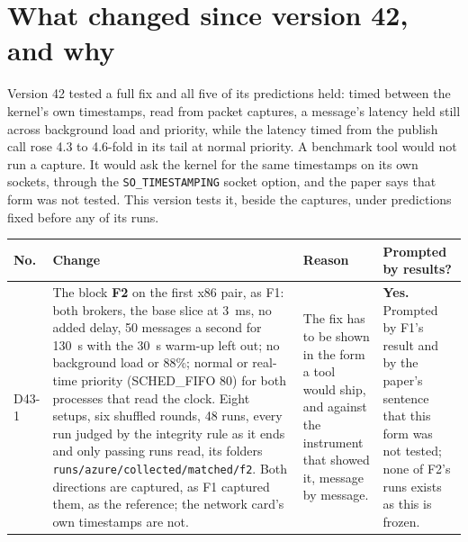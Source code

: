 \documentclass[11pt]{article}
\begin{document}
\section*{What changed since version 42, and why}
Version 42 tested a full fix and all five of its predictions held: timed between the kernel's own
timestamps, read from packet captures, a message's latency held still across background load and
priority, while the latency timed from the publish call rose 4.3 to 4.6-fold in its tail at normal
priority. A benchmark tool would not run a capture. It would ask the kernel for the same timestamps
on its own sockets, through the \texttt{SO\_TIMESTAMPING} socket option, and the paper says that
form was not tested. This version tests it, beside the captures, under predictions fixed before any
of its runs.

{\small
\begin{longtable}{@{}p{1.1cm} >{\raggedright\arraybackslash}p{6.1cm} >{\raggedright\arraybackslash}p{6.0cm} >{\raggedright\arraybackslash}p{2.2cm}@{}}
\toprule
\textbf{No.} & \textbf{Change} & \textbf{Reason} & \textbf{Prompted by results?} \\
\midrule
\endhead
D43-1 & The block \textbf{F2} on the first x86 pair, as F1: both brokers, the base slice at 3~ms, no added delay, 50 messages a second for 130~s with the 30~s warm-up left out; no background load or 88\%; normal or real-time priority (SCHED\_FIFO 80) for both processes that read the clock. Eight setups, six shuffled rounds, 48 runs, every run judged by the integrity rule as it ends and only passing runs read, its folders \texttt{runs/azure/collected/matched/f2}. Both directions are captured, as F1 captured them, as the reference; the network card's own timestamps are not. & The fix has to be shown in the form a tool would ship, and against the instrument that showed it, message by message. & \textbf{Yes.} Prompted by F1's result and by the paper's sentence that this form was not tested; none of F2's runs exists as this is frozen. \\

\end{longtable}}
\end{document}
